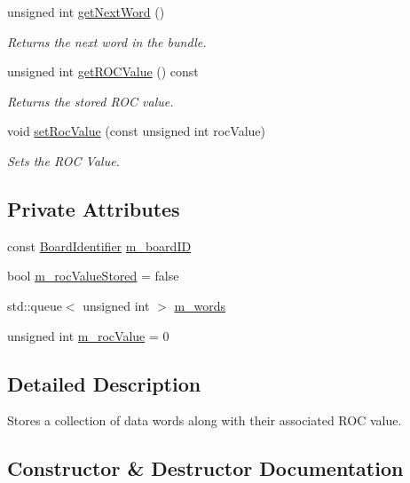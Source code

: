 \begin{DoxyCompactItemize}
unsigned int \hyperlink{class_word_bundle_a950e328fdf8b00e59b2d68da5182763f}{get\+Next\+Word} ()
\begin{DoxyCompactList}\small\item\em Returns the next word in the bundle. \end{DoxyCompactList}\item 
unsigned int \hyperlink{class_word_bundle_ad2c91f230ac93d19900eba6b2c64d0e9}{get\+R\+O\+C\+Value} () const
\begin{DoxyCompactList}\small\item\em Returns the stored R\+OC value. \end{DoxyCompactList}\item 
void \hyperlink{class_word_bundle_a15e13fdd7380c72be2f42013560d62c3}{set\+Roc\+Value} (const unsigned int roc\+Value)
\begin{DoxyCompactList}\small\item\em Sets the R\+OC Value. \end{DoxyCompactList}\end{DoxyCompactItemize}
\subsection*{Private Attributes}
\begin{DoxyCompactItemize}
\item 
const \hyperlink{class_board_identifier}{Board\+Identifier} \hyperlink{class_word_bundle_a77d34b8fe38566bc2b3144675aa53c77}{m\+\_\+board\+ID}
\item 
bool \hyperlink{class_word_bundle_a7605157c872054d7ab42b590fac97ca7}{m\+\_\+roc\+Value\+Stored} = false
\item 
std\+::queue$<$ unsigned int $>$ \hyperlink{class_word_bundle_a58233a5455b9a594e3441dd79e3d6a3b}{m\+\_\+words}
\item 
unsigned int \hyperlink{class_word_bundle_a2510a567b83584e8b53395168d53c401}{m\+\_\+roc\+Value} = 0
\end{DoxyCompactItemize}


\subsection{Detailed Description}
Stores a collection of data words along with their associated R\+OC value. 

\subsection{Constructor \& Destructor Documentation}
\mbox{\label{class_word_bundle_ad097d49b23d5063e1be3ebc05022465b}} 
